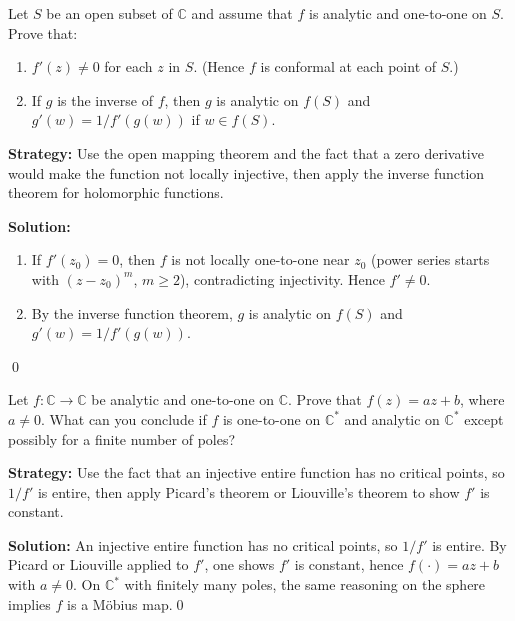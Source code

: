 \begin{problembox}
\begin{problemstatement}
Let \( S \) be an open subset of \( \mathbb{C} \) and assume that \( f \) is analytic and one-to-one on \( S \). Prove that:
\begin{enumerate}[label=(\alph*)]
\item \( f'(z) \neq 0 \) for each \( z \) in \( S \). (Hence \( f \) is conformal at each point of \( S \).)
\item If \( g \) is the inverse of \( f \), then \( g \) is analytic on \( f(S) \) and \( g'(w) = 1 / f'(g(w)) \) if \( w \in f(S) \).
\end{enumerate}
\end{problemstatement}
\end{problembox}

\noindent\textbf{Strategy:} Use the open mapping theorem and the fact that a zero derivative would make the function not locally injective, then apply the inverse function theorem for holomorphic functions.

\bigskip\noindent\textbf{Solution:}
\begin{enumerate}[label=(\alph*)]
\item If $f'(z_0)=0$, then $f$ is not locally one-to-one near $z_0$ (power series starts with $(z-z_0)^m$, $m\ge2$), contradicting injectivity. Hence $f'\ne0$.
\item By the inverse function theorem, $g$ is analytic on $f(S)$ and $g'(w)=1/f'(g(w))$.
\end{enumerate}\qed


\begin{problembox}
\begin{problemstatement}
Let \( f : \mathbb{C} \to \mathbb{C} \) be analytic and one-to-one on \( \mathbb{C} \). Prove that \( f(z) = a z + b \), where \( a \neq 0 \). What can you conclude if \( f \) is one-to-one on \( \mathbb{C}^* \) and analytic on \( \mathbb{C}^* \) except possibly for a finite number of poles?
\end{problemstatement}
\end{problembox}

\noindent\textbf{Strategy:} Use the fact that an injective entire function has no critical points, so \( 1/f' \) is entire, then apply Picard's theorem or Liouville's theorem to show \( f' \) is constant.

\bigskip\noindent\textbf{Solution:}
An injective entire function has no critical points, so $1/f'$ is entire. By Picard or Liouville applied to $f'$, one shows $f'$ is constant, hence $f(\cdot)=a z+b$ with $a\ne0$. On $\mathbb C^*$ with finitely many poles, the same reasoning on the sphere implies $f$ is a Möbius map.\qed


